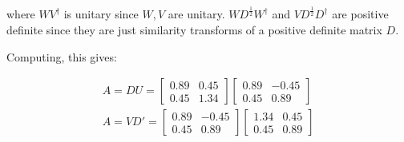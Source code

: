 \documentclass[11pt]{book}
\begin{document}
where $WV^\dagger$ is unitary since $W, V$ are unitary. $WD^\frac{1}{2}W^\dagger$
and $VD^\frac{1}{2}D^\dagger$ are positive definite since they are just
similarity transforms of a positive definite matrix $D$.

Computing, this gives:

\begin{align*}
    A = DU = \begin{bmatrix} 0.89 & 0.45 \\0.45 & 1.34 \end{bmatrix} \begin{bmatrix} 0.89 & -0.45 \\ 0.45 & 0.89 \end{bmatrix} \\
    A = VD' =  \begin{bmatrix} 0.89 & -0.45 \\ 0.45 & 0.89 \end{bmatrix} \begin{bmatrix} 1.34 & 0.45 \\ 0.45 & 0.89 \end{bmatrix} \\
\end{align*}
\end{document}
